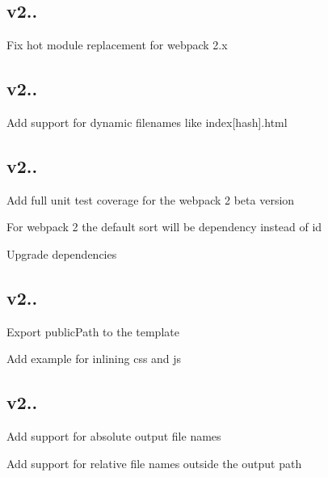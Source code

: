 \subsection*{v2.. }


\begin{DoxyItemize}
\item Fix hot module replacement for webpack 2.\+x
\end{DoxyItemize}

\subsection*{v2.. }


\begin{DoxyItemize}
\item Add support for dynamic filenames like index\mbox{[}hash\mbox{]}.html
\end{DoxyItemize}

\subsection*{v2.. }


\begin{DoxyItemize}
\item Add full unit test coverage for the webpack 2 beta version
\item For webpack 2 the default sort will be \textquotesingle{}dependency\textquotesingle{} instead of \textquotesingle{}id\textquotesingle{}
\item Upgrade dependencies
\end{DoxyItemize}

\subsection*{v2.. }


\begin{DoxyItemize}
\item Export public\+Path to the template
\item Add example for inlining css and js
\end{DoxyItemize}

\subsection*{v2.. }


\begin{DoxyItemize}
\item Add support for absolute output file names
\item Add support for relative file names outside the output path
\end{DoxyItemize}

